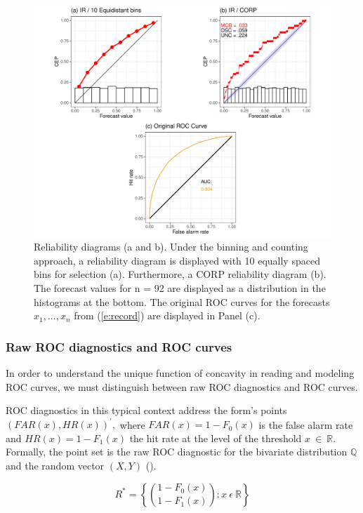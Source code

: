 \documentclass[a4paper,12pt]{article}
\numberwithin{equation}{section}
\begin{document}
   \begin{figure}[hbt!]
      \centering
      \includegraphics[scale=0.65]{Plots_sim/layout1.pdf}
      \caption{Reliability diagrams (a and b). Under the binning and counting approach, a reliability diagram is displayed with 10 equally spaced bins for selection (a). Furthermore, a CORP reliability diagram (b). The forecast values for n = 92 are displayed as a distribution in the histograms at the bottom. The original ROC curves for the forecasts $x_{1},...,x_{n}$ from (\ref{e:record}) are displayed in Panel (c).}
      \label{fig:layout1}
  \end{figure}


   \subsubsection{Raw ROC diagnostics and ROC curves}
   In order to understand the unique function of concavity in reading and modeling ROC curves, we must distinguish between raw ROC diagnostics and ROC curves.\bigskip

   ROC diagnostics in this typical context address the form's points $(FAR(x), HR(x))^{'},$ where $FAR(x)=1-F_{0}(x)$ is the false alarm rate and $HR(x)=1-F_{1}(x)$ the hit rate at the level of the threshold $x \ \in \ \mathbb{R} $. Formally, the point set is the raw ROC diagnostic for the bivariate distribution $\mathbb{Q}$ and the random vector $(X, Y)$ (\cite{roc2}).

   \begin{equation} \label{e:bivariate} 
   R^{*} = \left\{ \binom{1-F_{0}(x)}{1-F_{1}(x)}: x \  \epsilon \  \mathbb{R} \right\}  
   \end{equation}
\end{document}

